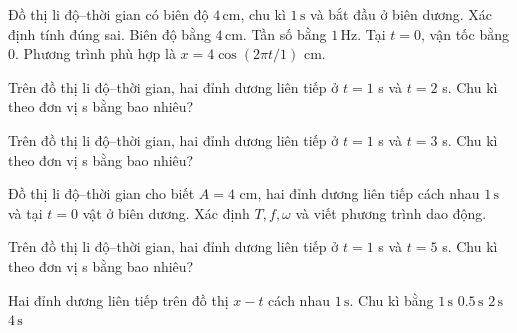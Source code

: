 \begin{ex}
Đồ thị li độ–thời gian có biên độ $4\,\text{cm}$, chu kì $1\,\text{s}$ và bắt đầu ở biên dương. Xác định tính đúng sai.
\choiceTF
{\True Biên độ bằng $4\,\text{cm}$.}
{\True Tần số bằng $1\,\text{Hz}$.}
{\True Tại $t=0$, vận tốc bằng 0.}
{\True Phương trình phù hợp là $x=4\cos(2\pi t/1)$ cm.}
\end{ex}

\begin{ex}
Trên đồ thị li độ–thời gian, hai đỉnh dương liên tiếp ở $t=1$ s và $t=2$ s. Chu kì theo đơn vị s bằng bao nhiêu?
\end{ex}

\begin{ex}
Trên đồ thị li độ–thời gian, hai đỉnh dương liên tiếp ở $t=1$ s và $t=3$ s. Chu kì theo đơn vị s bằng bao nhiêu?
\end{ex}

\begin{ex}
Đồ thị li độ–thời gian cho biết $A=4$ cm, hai đỉnh dương liên tiếp cách nhau $1\,\text{s}$ và tại $t=0$ vật ở biên dương. Xác định $T,f,\omega$ và viết phương trình dao động.
\choiceTF

\end{ex}

\begin{ex}
Trên đồ thị li độ–thời gian, hai đỉnh dương liên tiếp ở $t=1$ s và $t=5$ s. Chu kì theo đơn vị s bằng bao nhiêu?
\end{ex}

\begin{ex}
Hai đỉnh dương liên tiếp trên đồ thị $x-t$ cách nhau $1\,\text{s}$. Chu kì bằng
\choice
{\True $1\,\text{s}$}
{$0.5\,\text{s}$}
{$2\,\text{s}$}
{$4\,\text{s}$}
\end{ex}
